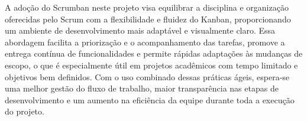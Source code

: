 A adoção do Scrumban neste projeto visa equilibrar a disciplina e
organização oferecidas pelo Scrum com a flexibilidade e fluidez do
Kanban, proporcionando um ambiente de desenvolvimento mais adaptável
e visualmente claro. Essa abordagem facilita a priorização e o
acompanhamento das tarefas, promove a entrega contínua de
funcionalidades e permite rápidas adaptações às mudanças de escopo, o
que é especialmente útil em projetos acadêmicos com tempo limitado e
objetivos bem definidos. Com o uso combinado dessas práticas ágeis,
espera-se uma melhor gestão do fluxo de trabalho, maior transparência
nas etapas de desenvolvimento e um aumento na eficiência da equipe
durante toda a execução do projeto.

\newpage
